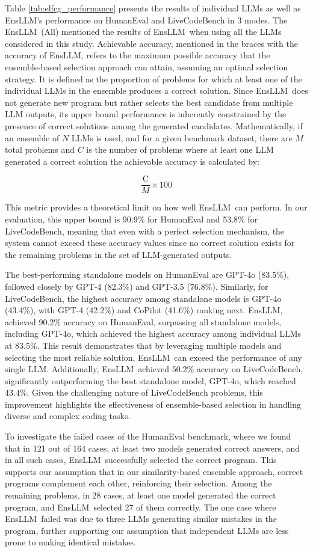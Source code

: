 \documentclass{article}
\newcommand{\tool}{EnsLLM}
\begin{document}
Table \ref{tab:elfcg_performance} presents the results of individual LLMs as well as \tool's performance on HumanEval and LiveCodeBench in 3 modes. The \tool\ (All) mentioned the results of \tool\ when using all the LLMs considered in this study.
Achievable accuracy, mentioned in the braces with the accuracy of \tool, refers to the maximum possible accuracy that the ensemble-based selection approach can attain, assuming an optimal selection strategy. It is defined as the proportion of problems for which at least one of the individual LLMs in the ensemble produces a correct solution. Since \tool\ does not generate new program but rather selects the best candidate from multiple LLM outputs, its upper bound performance is inherently constrained by the presence of correct solutions among the generated candidates.  
Mathematically, if an ensemble of \( N \) LLMs is used, and for a given benchmark dataset, there are \( M \) total problems and \( C \) is the number of problems where at least one LLM generated a correct solution  the achievable accuracy is calculated by:  

\[
\frac{\text{C}}{M} \times 100
\]

This metric provides a theoretical limit on how well \tool\ can perform. In our evaluation, this upper bound is 90.9\% for HumanEval and 53.8\% for LiveCodeBench, meaning that even with a perfect selection mechanism, the system cannot exceed these accuracy values since no correct solution exists for the remaining problems in the set of LLM-generated outputs.

The best-performing standalone models on HumanEval are GPT-4o (83.5\%), followed closely by GPT-4 (82.3\%) and GPT-3.5 (76.8\%). Similarly, for LiveCodeBench, the highest accuracy among standalone models is GPT-4o (43.4\%), with GPT-4 (42.2\%) and CoPilot (41.6\%) ranking next.
\tool, achieved 90.2\% accuracy on HumanEval, surpassing all standalone models, including GPT-4o, which achieved the highest accuracy among individual LLMs at 83.5\%. This result demonstrates that by leveraging multiple models and selecting the most reliable solution, \tool\ can exceed the performance of any single LLM. Additionally, \tool\ achieved 50.2\% accuracy on LiveCodeBench, significantly outperforming the best standalone model, GPT-4o, which reached 43.4\%. Given the challenging nature of LiveCodeBench problems, this improvement highlights the effectiveness of ensemble-based selection in handling diverse and complex coding tasks.

To investigate the failed cases of the HumanEval benchmark, where we found that in 121 out of 164 cases, at least two models generated correct answers, and in all such cases, \tool\ successfully selected the correct program. This supports our assumption that in our similarity-based ensemble approach, correct programs complement each other, reinforcing their selection. Among the remaining problems, in 28 cases, at least one model generated the correct program, and \tool\ selected 27 of them correctly. The one case where \tool\ failed was due to three LLMs generating similar mistakes in the program, further supporting our assumption that independent LLMs are less prone to making identical mistakes.
\end{document}
